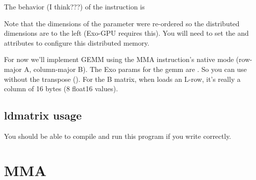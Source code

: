 The behavior (I think???) of the instruction is



Note that the dimensions of the  parameter were re-ordered so the distributed dimensions are to the left (Exo-GPU requires this).
You will need to set the  and  attributes to configure this distributed memory.

For now we'll implement GEMM using the MMA instruction's native  mode (row-major A, column-major B).
The Exo params for the gemm are .
So you can use  without the transpose ().
For the B matrix, when  loads an L-row, it's really a column of 16 bytes (8 float16 values).


\subsection{ldmatrix usage}

You should be able to compile and run this program if you write  correctly.



\section{MMA}


